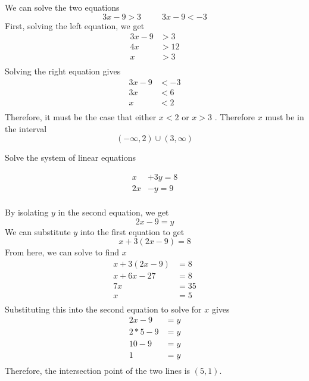 \documentclass[addpoints,12pt]{exam}
\begin{document}
\begin{questions}
\begin{solution}
    We can solve the two equations 
		\[
		3x - 9 > 3 \hspace{30pt} 3x - 9 < -3 
		\]
		First, solving the left equation, we get 
		\begin{align*}
		    3x - 9 & > 3 \\
				4x & > 12 \\
				x & > 3 \\
		\end{align*}
		Solving the right equation gives 
		\begin{align*}
			3x - 9 & < -3 \\
			3x  & < 6 \\
			x & < 2 \\
		\end{align*}
		Therefore, it must be the case that either $x <2 $ or $x >3$ . Therefore $x$ must be in the interval 
		\[
			(-\infty,2) \cup (3, \infty)
		\]
\end{solution}

\question Solve the system of linear equations

\begin{align*}
	x&+3y=8\\
	2x&-y=9\\
\end{align*}

\begin{solution}
    By isolating $y$ in the second equation, we get 
		\[
		2x - 9 = y 
		\]
		We can substitute $y$ into the first equation to get 
		\[
		x + 3(2x - 9 ) = 8 
		\] 
		From here, we can solve to find $x$ 
		\begin{align*}
			x + 3(2x-9) & = 8 \\
			x + 6x -27 & = 8 \\
			7x & = 35 \\
			x & = 5 \\
		\end{align*}
		Substituting this into the second equation to solve for $x$ gives 
		\begin{align*}
		    2x - 9 & = y \\
				2*5 -9 & = y \\
				10 - 9 & = y \\
				1 & = y \\
		\end{align*}
		Therefore, the intersection point of the two lines is $(5,1)$. 
\end{solution}


\end{questions}
\end{document}
